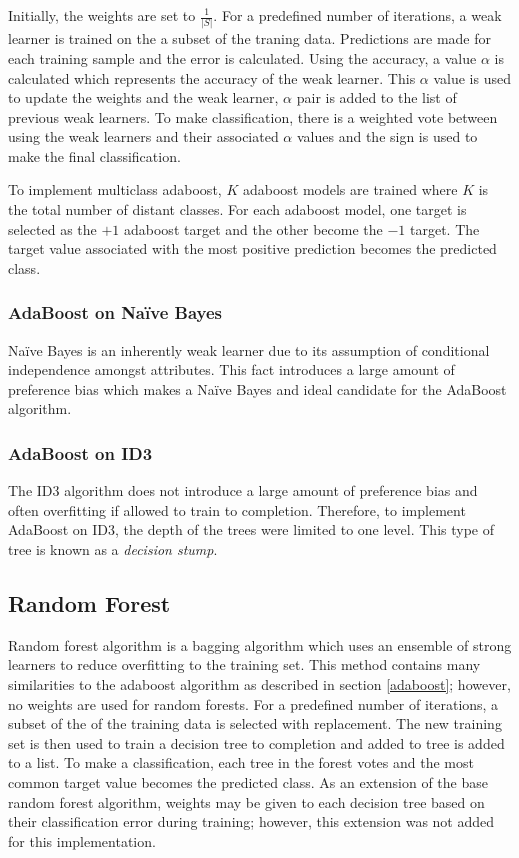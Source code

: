 \documentclass[11pt]{article}
\newcommand{\ii}{\textit}
\begin{document}
Initially, the weights are set to $\frac{1}{|S|}$. For a predefined number of iterations, a weak learner is trained on the a subset of the traning data. Predictions are made for each training sample and the error is calculated. Using the accuracy, a value $\alpha$ is calculated which represents the accuracy of the weak learner. This $\alpha$ value is used to update the weights and the weak learner, $\alpha$ pair is added to the list of previous weak learners. To make classification, there is a weighted vote between using the weak learners and their associated $\alpha$ values and the sign is used to make the final classification.

To implement multiclass adaboost, $K$ adaboost models are trained where $K$ is the total number of distant classes. For each adaboost model, one target is selected as the $+1$ adaboost target and the other become the $-1$ target. The target value associated with the most positive prediction becomes the predicted class.

\subsubsection{AdaBoost on Naïve Bayes}
Naïve Bayes is an inherently weak learner due to its assumption of conditional independence amongst attributes. This fact introduces a large amount of preference bias which makes a Naïve Bayes and ideal candidate for the AdaBoost algorithm.

\subsubsection{AdaBoost on ID3}
The ID3 algorithm does not introduce a large amount of preference bias and often overfitting if allowed to train to completion. Therefore, to implement AdaBoost on ID3, the depth of the trees were limited to one level. This type of tree is known as a \ii{decision stump}.

\subsection{Random Forest}
Random forest algorithm is a bagging algorithm which uses an ensemble of strong learners to reduce overfitting to the training set. This method contains many similarities to the adaboost algorithm as described in section \ref{adaboost}; however, no weights are used for random forests. For a predefined number of iterations, a subset of the of the training data is selected with replacement. The new training set is then used to train a decision tree to completion and added to tree is added to a list. To make a classification, each tree in the forest votes and the most common target value becomes the predicted class. As an extension of the base random forest algorithm, weights may be given to each decision tree based on their classification error during training; however, this extension was not added for this implementation.
\end{document}
